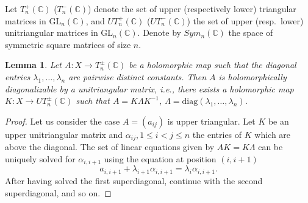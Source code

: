 \documentclass[10pt]{amsart}
\newtheorem{lemm}[theo]{Lemma}
\theoremstyle{remark}
\begin{document}
Let $T^+_n(\mathbb{C})$ ($T^-_n(\mathbb{C})$) denote the set of upper (respectively lower) triangular matrices in $\mathrm{GL}_n(\mathbb{C})$, and $UT^+_n(\mathbb{C})$ ($UT^-_n(\mathbb{C})$) the set of upper (resp.\ lower) unitriangular matrices in $\mathrm{GL}_n(\mathbb{C})$. Denote by $Sym_n(\mathbb{C})$ the space of symmetric square matrices of size $n$. 

\begin{lemm}\label{fact-ele-lemm}
Let $A: X \to T^\pm_n(\mathbb{C})$ be a holomorphic map such that the diagonal entries $\lambda_1, \dots, \lambda_n$ are pairwise distinct constants. Then $A$ is holomorphically diagonalizable by a unitriangular matrix, i.e., there exists a holomorphic map $K: X \to UT^\pm_n(\mathbb{C})$ such that $A = K\Lambda K^{-1}$, $\Lambda = \mathrm{diag}(\lambda_1, \dots, \lambda_n)$.   
\end{lemm}
\begin{proof}
    Let us consider the case $A = (a_{ij})$ is upper triangular. 
    Let $K$ be an upper unitriangular matrix and $\alpha_{ij}, 1 \le i < j \le n$ the entries of $K$ which are above the diagonal. The set of linear equations given by $A K = K \Lambda$ can be uniquely solved for $\alpha_{i, i+1}$ using the equation at position $(i, i+1)$
    \[
        a_{i, i+1} + \lambda_{i+1} \alpha_{i, i+1} = \lambda_i \alpha_{i, i+1}.
    \]
    After having solved the first superdiagonal, continue with the second superdiagonal, and so on. 
\end{proof}
\end{document}
